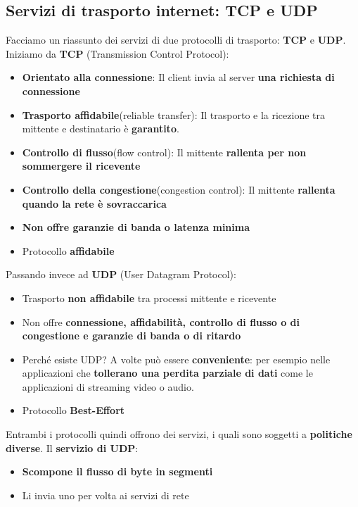 \documentclass[12pt]{article}
\begin{document}
\subsection{Servizi di trasporto internet: TCP e UDP}
Facciamo un riassunto dei servizi di due protocolli di trasporto: \textbf{TCP} e \textbf{UDP}. \newline
Iniziamo da \textbf{TCP} (Transmission Control Protocol):
\begin{itemize}
    \item \textbf{Orientato alla connessione}: Il client invia al server \textbf{una richiesta di connessione}
    \item \textbf{Trasporto affidabile}(reliable transfer): Il trasporto e la ricezione tra mittente e destinatario è \textbf{garantito}.
    \item \textbf{Controllo di flusso}(flow control): Il mittente \textbf{rallenta per non sommergere il ricevente}
    \item \textbf{Controllo della congestione}(congestion control): Il mittente \textbf{rallenta quando la rete è sovraccarica}
    \item \textbf{Non offre garanzie di banda o latenza minima}
    \item Protocollo \textbf{affidabile}
\end{itemize}
Passando invece ad \textbf{UDP} (User Datagram Protocol):
\begin{itemize}
    \item Trasporto \textbf{non affidabile} tra processi mittente e ricevente
    \item Non offre \textbf{connessione, affidabilità, controllo di flusso o di congestione e garanzie di banda o di ritardo}
    \item Perché esiste UDP? A volte può essere \textbf{conveniente}: per esempio nelle applicazioni che \textbf{tollerano una perdita parziale di dati} come le applicazioni di streaming video o audio.
    \item Protocollo \textbf{Best-Effort}
\end{itemize}
Entrambi i protocolli quindi offrono dei servizi, i quali sono soggetti a \textbf{politiche diverse}. \newline
Il \textbf{servizio di UDP}:
\begin{itemize}
    \item \textbf{Scompone il flusso di byte in segmenti}
    \item Li invia uno per volta ai servizi di rete
\end{itemize}
\end{document}
